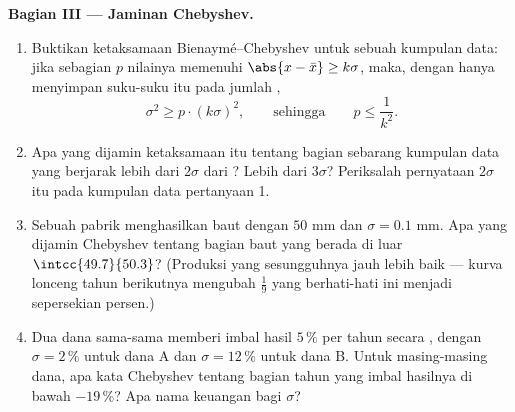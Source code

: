 \begin{problem}
\medskip
\noindent\textbf{Bagian III --- Jaminan Chebyshev.}
\begin{enumerate}[resume]
  \item Buktikan ketaksamaan Bienaymé--Chebyshev untuk sebuah
        kumpulan data: jika sebagian $p$ nilainya memenuhi
        $\abs{x - \bar x} \geq k\sigma$, maka, dengan hanya menyimpan
        suku-suku itu pada jumlah ,
        \[
        \sigma^2 \geq p \cdot (k\sigma)^2,
        \qquad\text{sehingga}\qquad
        p \leq \frac{1}{k^2} .
        \]
  \item Apa yang dijamin ketaksamaan itu tentang bagian
        sebarang kumpulan data yang berjarak lebih dari $2\sigma$ dari
        ? Lebih dari $3\sigma$? Periksalah pernyataan $2\sigma$ itu
        pada kumpulan data pertanyaan 1.
  \item Sebuah pabrik menghasilkan baut dengan  $50$ mm dan
        $\sigma = 0.1$ mm. Apa yang dijamin Chebyshev tentang
        bagian baut yang berada di luar
        $\intcc{49.7}{50.3}$? (Produksi yang sesungguhnya jauh lebih baik
        --- kurva lonceng tahun berikutnya mengubah $\frac19$ yang
        berhati-hati ini menjadi sepersekian persen.)
  \item Dua dana sama-sama memberi imbal hasil $5\,\%$ per tahun secara
        , dengan $\sigma = 2\,\%$ untuk dana A dan $\sigma = 12\,\%$
        untuk dana B. Untuk masing-masing dana, apa kata Chebyshev tentang
        bagian tahun yang imbal hasilnya di bawah $-19\,\%$? Apa nama
        keuangan bagi $\sigma$?
\end{enumerate}


\end{problem}
